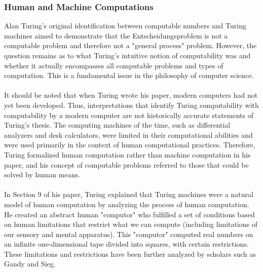 \documentclass[10pt,a4paper]{article}
\begin{document}
                \subsubsection{Human and Machine Computations}
                Alan Turing's original identification between computable numbers and Turing machines aimed to demonstrate that the Entscheidungsproblem is not a computable problem and therefore not a "general process" problem. However, the question remains as to what Turing's intuitive notion of computability was and whether it actually encompasses all computable problems and types of computation. This is a fundamental issue in the philosophy of computer science.
                \\
                \\
                It should be noted that when Turing wrote his paper, modern computers had not yet been developed. Thus, interpretations that identify Turing computability with computability by a modern computer are not historically accurate statements of Turing's thesis. The computing machines of the time, such as differential analyzers and desk calculators, were limited in their computational abilities and were used primarily in the context of human computational practices. Therefore, Turing formalized human computation rather than machine computation in his paper, and his concept of computable problems referred to those that could be solved by human means.
                \\
                \\
                In Section 9 of his paper, Turing explained that Turing machines were a natural model of human computation by analyzing the process of human computation. He created an abstract human "computor" who fulfilled a set of conditions based on human limitations that restrict what we can compute (including limitations of our sensory and mental apparatus). This "computor" computed real numbers on an infinite one-dimensional tape divided into squares, with certain restrictions. These limitations and restrictions have been further analyzed by scholars such as Gandy and Sieg.
\end{document}
